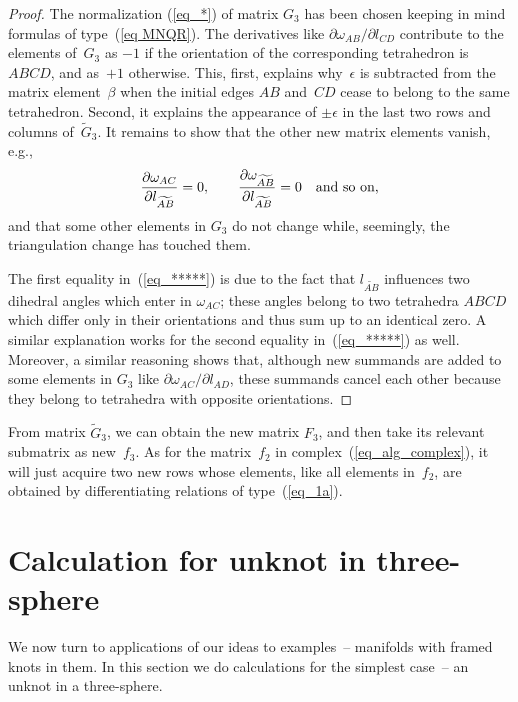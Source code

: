 \documentclass[pdftex]{sigma}
\begin{document}
\begin{proof}
The normalization (\ref{eq_*}) of matrix $G_3$ has been chosen keeping in mind formulas of type~(\ref{eq MNQR}). The derivatives like $\partial \omega_{AB}/\partial l_{CD}$ contribute to the elements of~$G_3$ as $-1$ if the orientation of the corresponding tetrahedron is~$ABCD$, and as~$+1$ otherwise. This, f\/irst, explains why~$\epsilon$ is subtracted from the matrix element~$\beta$ when the initial edges $AB$ and~$CD$ cease to belong to the same tetrahedron. Second, it explains the appearance of $\pm\epsilon$ in the last two rows and columns of~$\widetilde G_3$. It remains to show that the other new matrix elements vanish, e.g.,
\begin{equation}
\frac{\partial \omega_{AC}}{\partial l_{\widetilde{AB}}} = 0, \qquad \frac{\partial \omega_{\widetilde{AB}}}{\partial l_{\widetilde{AB}}} = 0 \quad
\hbox{and so on,}
\label{eq_*****}
\end{equation}
and that some other elements in $G_3$ do not change while, seemingly, the triangulation change has touched them.

The f\/irst equality in~(\ref{eq_*****}) is due to the fact that $l_{\widetilde{AB}}$ inf\/luences two dihedral angles which enter in $\omega_{AC}$;
these angles belong to two tetrahedra $ABCD$ which dif\/fer only in their orientations and thus sum up to an identical zero. A similar explanation
works for the second equality in~(\ref{eq_*****}) as well. Moreover, a similar reasoning shows that, although new summands are added to some elements in $G_3$ like $\partial \omega_{AC} / \partial l_{AD}$, these summands cancel each other because they belong to tetrahedra with opposite
orientations.
\end{proof}

From matrix $\widetilde G_3$, we can obtain the new matrix $F_3$, and then take its relevant submatrix as new~$f_3$. As for the matrix~$f_2$
in complex~(\ref{eq_alg_complex}), it will just acquire two new rows whose elements, like all elements in~$f_2$, are obtained by dif\/ferentiating relations of type~(\ref{eq_1a}).


\section{Calculation for unknot in three-sphere}
\label{sec_unknot}

We now turn to applications of our ideas to examples~-- manifolds with framed knots in them. In this section we do calculations for the simplest case~-- an unknot in a three-sphere.
\end{document}
